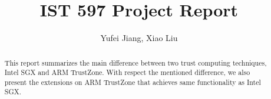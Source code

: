 \documentclass[]{article}
\title{IST 597 Project Report}
\author{Yufei Jiang, Xiao Liu}
\date{}
\begin{document}
\maketitle

\begin{abstract}
This report summarizes the main difference between two trust computing techniques, Intel SGX 
and ARM TrustZone. With respect the mentioned difference, we also present the 
extensions on ARM TrustZone that achieves same functionality as Intel SGX.
\end{abstract}



 













\end{document}

